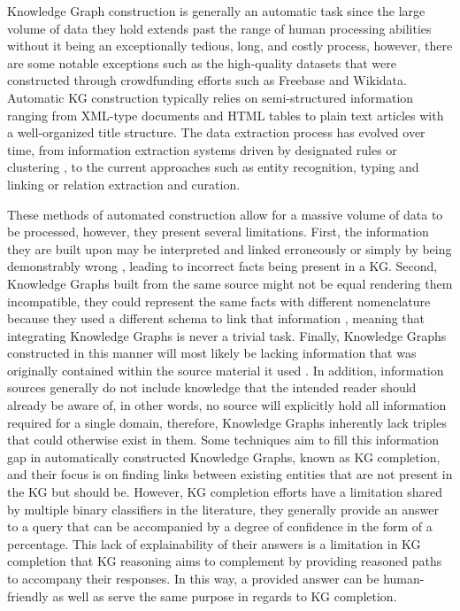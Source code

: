 Knowledge Graph construction is generally an automatic task since the large volume of data they hold extends past the range of human processing abilities without it being an exceptionally tedious, long, and costly process, however, there are some notable exceptions such as the high-quality datasets that were constructed through crowdfunding efforts such as Freebase\cite{bollacker2007freebase} and Wikidata\cite{vrandevcic2014wikidata}. Automatic KG construction typically relies on semi-structured\cite{lehmann2015dbpedia} information ranging from XML-type documents and HTML tables to plain text articles with a well-organized title structure.
The data extraction process has evolved over time, from information extraction systems driven by designated rules or clustering \cite{yates2007textrunner, etzioni2004web}, to the current approaches such as entity recognition\cite{huang2015bidirectional, ma2016end}, typing\cite{xu2018neural, ren2016label} and linking\cite{ganea2017deep, le2018improving} or relation extraction and curation\cite{zeng2015distant, zhou2016attention}. 

These methods of automated construction allow for a massive volume of data to be processed, however, they present several limitations.
First, the information they are built upon may be interpreted and linked erroneously or simply by being demonstrably wrong \cite{martinez2020information}, leading to incorrect facts being present in a KG. 
Second, Knowledge Graphs built from the same source might not be equal rendering them incompatible, they could represent the same facts with different nomenclature because they used a different schema to link that information \cite{choi2006survey}, meaning that integrating Knowledge Graphs is never a trivial task.
Finally, Knowledge Graphs constructed in this manner will most likely be lacking information that was originally contained within the source material it used \cite{bordes2014constructing}. In addition, information sources generally do not include knowledge that the intended reader should already be aware of, in other words, no source will explicitly hold all information required for a single domain, therefore, Knowledge Graphs inherently lack triples that could otherwise exist in them.
Some techniques aim to fill this information gap in automatically constructed Knowledge Graphs, known as KG completion, and their focus is on finding links between existing entities that are not present in the KG but should be. However, KG completion efforts have a limitation shared by multiple binary classifiers in the literature, they generally provide an answer to a query that can be accompanied by a degree of confidence in the form of a percentage. This lack of explainability of their answers is a limitation in KG completion that KG reasoning aims to complement by providing reasoned paths to accompany their responses. In this way, a provided answer can be human-friendly as well as serve the same purpose in regards to KG completion.

